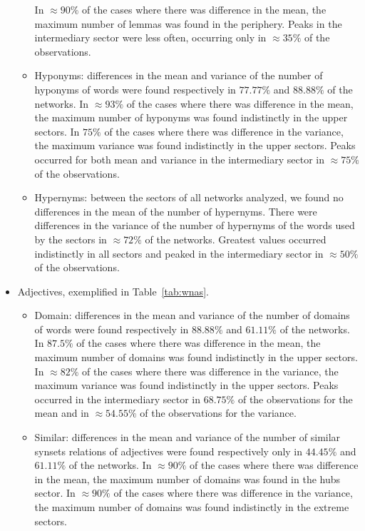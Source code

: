\begin{itemize}
\begin{itemize}
In $\approx 90\%$ of the cases where there was difference in the mean, the maximum number of lemmas was found in the periphery.
Peaks in the intermediary sector were less often, occurring only in $\approx 35\%$ of the observations.
\item Hyponyms:
differences in the mean and variance of the number of hyponyms of words were found respectively in $77.77\%$ and $88.88\%$ of the networks.
In $\approx 93\%$ of the cases where there was difference in the mean, 
the maximum number of hyponyms was found indistinctly in the upper sectors.
In $75\%$ of the cases where there was difference in the variance, 
the maximum variance was found indistinctly in the upper sectors.
Peaks occurred for both mean and variance in the intermediary sector in $\approx 75\%$ of the observations.
\item Hypernyms:
between the sectors of all networks analyzed, we found no differences in the mean of the number of hypernyms.
There were differences in the variance of the number of hypernyms of the words used by the sectors in $\approx 72\%$ of the networks.
Greatest values occurred indistinctly in all sectors and peaked in the intermediary sector in $\approx 50\%$ of the observations.

\FloatBarrier
\end{itemize}
\item Adjectives, exemplified in Table~\ref{tab:wnas}.
\begin{itemize}
\item Domain:
differences in the mean and variance of the number of domains of words were found respectively in $88.88\%$ and $61.11\%$ of the networks.
In $87.5\%$ of the cases where there was difference in the mean, 
the maximum number of domains was found indistinctly in the upper sectors.
In $\approx 82\%$ of the cases where there was difference in the variance, 
the maximum variance was found indistinctly in the upper sectors.
Peaks occurred in the intermediary sector in $68.75\%$ of the observations for the mean
and in $\approx 54.55\%$ of the observations for the variance.
\item Similar:
differences in the mean and variance of the number of similar synsets relations of adjectives were found respectively only in $44.45\%$ and $61.11\%$ of the networks.
In $\approx 90\%$ of the cases where there was difference in the mean, 
the maximum number of domains was found in the hubs sector.
In $\approx 90\%$ of the cases where there was difference in the variance, 
the maximum number of domains was found indistinctly in the extreme sectors.

\end{itemize}
\end{itemize}
